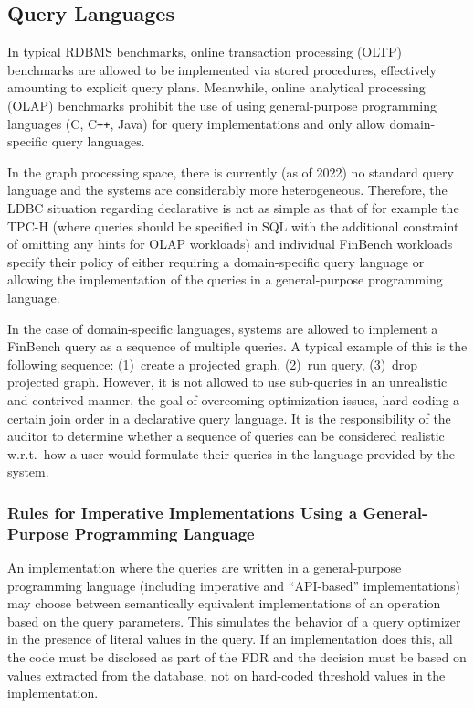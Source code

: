 \subsection{Query Languages}
\label{sec:query-languages}

In typical RDBMS benchmarks, online transaction processing (OLTP) benchmarks are allowed to be implemented via stored procedures, effectively amounting to explicit query plans.
Meanwhile, online analytical processing (OLAP) benchmarks prohibit the use of using general-purpose programming languages (\eg C, C\texttt{++}, Java) for query implementations and only allow domain-specific query languages.

In the graph processing space, there is currently (as of 2022) no standard query language and the systems are considerably more heterogeneous.
Therefore, the LDBC situation regarding declarative is not as simple as that of for example the \mbox{TPC-H} (where queries should be specified in SQL with the additional constraint of omitting any hints for OLAP workloads) and individual FinBench workloads specify their policy of either requiring a domain-specific query language or allowing the implementation of the queries in a general-purpose programming language.

In the case of domain-specific languages, systems are allowed to implement a FinBench query as a sequence of multiple queries.
A typical example of this is the following sequence:
(1)~create a projected graph,
(2)~run query,
(3)~drop projected graph.
However, it is not allowed to use sub-queries in an unrealistic and contrived manner, \ie the goal of overcoming optimization issues, \eg hard-coding a certain join order in a declarative query language.
It is the responsibility of the auditor to determine whether a sequence of queries can be considered realistic w.r.t.\ how a user would formulate their queries in the language provided by the system.

\subsubsection{Rules for Imperative Implementations Using a General-Purpose Programming Language}
An implementation where the queries are written in a general-purpose programming language (including imperative and ``API-based'' implementations) may choose between semantically equivalent implementations of an operation based on the query parameters. This simulates the behavior of a query optimizer in the presence of literal values in the query. If an implementation does this, all the code must be disclosed as part of the FDR and the decision must be based on values extracted from the database, not on hard-coded threshold values in the implementation.

